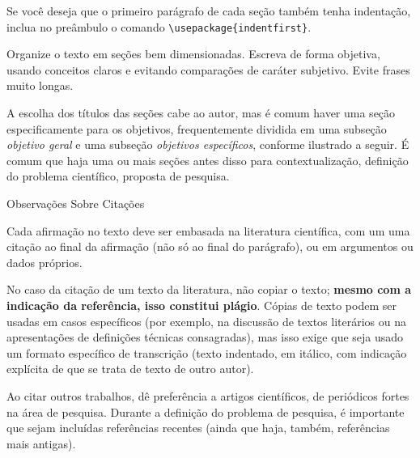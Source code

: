 \documentclass[a4paper, 12pt]{ppgeb}
\makeatletter
\renewcommand{\section}{\@startsection
{section}
{1}
{0mm}
{-\baselineskip}
{0.5\baselineskip}
{\large\bfseries\scshape}}
\makeatother
\begin{document}
Se você deseja que o primeiro parágrafo de cada seção também tenha indentação, inclua no preâmbulo o comando \verb,\usepackage{indentfirst},.

Organize o texto em seções bem dimensionadas. Escreva de forma objetiva, usando conceitos claros e evitando comparações de caráter subjetivo. Evite frases muito longas.

A escolha dos títulos das seções cabe ao autor, mas é comum haver uma seção especificamente para os objetivos, frequentemente dividida em uma subseção \emph{objetivo geral} e uma subseção \emph{objetivos específicos}, conforme ilustrado a seguir. É comum que haja uma ou mais seções antes disso para contextualização, definição do problema científico, proposta de pesquisa.

\section{Observações Sobre Citações}

Cada afirmação no texto deve ser embasada na literatura científica, com um uma citação ao final da afirmação (não só ao final do parágrafo), ou em argumentos ou dados próprios.

No caso da citação de um texto da literatura, não copiar o texto; \textbf{mesmo com a indicação da referência, isso constitui plágio}. Cópias de texto podem ser usadas em casos específicos (por exemplo, na discussão de textos literários ou na apresentações de definições técnicas consagradas), mas isso exige que seja usado um formato específico de transcrição (texto indentado, em itálico, com indicação explícita de que se trata de texto de outro autor).

Ao citar outros trabalhos, dê preferência a artigos científicos, de periódicos fortes na área de pesquisa. Durante a definição do problema de pesquisa, é importante que sejam incluídas referências recentes (ainda que haja, também, referências mais antigas).
\end{document}

